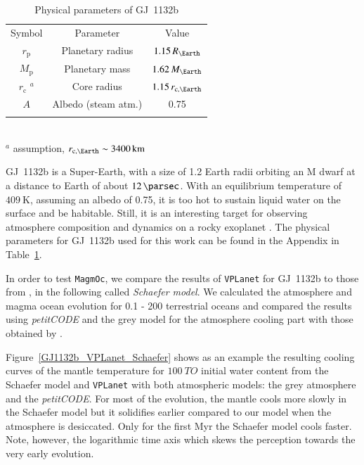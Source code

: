 \documentclass[paper=letterpaper,fontsize=12pt,oneside,twocolumn]{article}
\newcommand{\vplanet}{\texttt{\footnotesize{VPLanet}}}
\newcommand{\magmoc}{\texttt{\footnotesize{MagmOc}}}
\newcommand{\petit}{\textit{petitCODE}}
\begin{document}
\begin{table}[h]
	\caption[Parameters GJ~1132b]{Physical parameters of GJ~1132b \citep{Bonfils2018}}
	\begin{tabular}{ccc}
		\noalign{\smallskip}
		\hline
		\noalign{\smallskip}
		Symbol & Parameter & Value \\ 
		\noalign{\smallskip}
		\hline \hline
		\noalign{\smallskip}
		$r_\mathrm{p} $ & Planetary radius & $1.15 \, R_\Earth$ \\
		$M_\mathrm{p} $ & Planetary mass  & $1.62 \, M_\Earth$ \\
		$r_\mathrm{c}$ $^a$ & Core radius & $1.15 \, r_{\mathrm{c},\Earth}$ \\
		$A$ & Albedo (steam atm.)& 0.75 \\
		\noalign{\smallskip}
		\hline
	\end{tabular}
	\\
	$^a$ assumption, $r_{\mathrm{c},\Earth} \sim \SI{3400}{\kilo\metre}$
	\label{Tab_Param_GJ1132b}
\end{table}

GJ~1132b is a Super-Earth, with a size of 1.2 Earth radii orbiting an M dwarf at a distance to Earth of about $\SI{12}{\parsec}$.
With an equilibrium temperature of $\SI{409}{\kelvin}$, assuming an albedo of 0.75, it is too hot to sustain liquid water on the surface and be habitable.
Still, it is an interesting target for observing atmosphere composition and dynamics on a rocky exoplanet \citep{Berta-Thompson2015}.
The physical parameters for GJ~1132b used for this work can be found in the Appendix in Table~\ref{Tab_Param_GJ1132b}.

In order to test \magmoc{}, we compare the results of \vplanet{} for GJ~1132b to those from \citet{Schaefer2016}, in the following called \textit{Schaefer model}. We calculated the atmosphere and magma ocean evolution for 0.1 - 200 terrestrial oceans and compared the results using \petit{} \citep{Molliere2015, Molliere2017} and the grey model \citep{Elkins-Tanton2008, Carone2014} for the atmosphere cooling part with those obtained by \citet{Schaefer2016}.

Figure~\ref{GJ1132b_VPLanet_Schaefer} shows as an example the resulting cooling curves of the mantle temperature for $\SI{100}{TO}$ initial water content from the Schaefer model and \vplanet{} with both atmospheric models: the grey atmosphere and the \petit{}. For most of the evolution, the mantle cools more slowly in the Schaefer model but it solidifies earlier compared to our model when the atmosphere is desiccated. Only for the first Myr the Schaefer model cools faster. Note, however, the logarithmic time axis which skews the perception towards the very early evolution.
\end{document}
